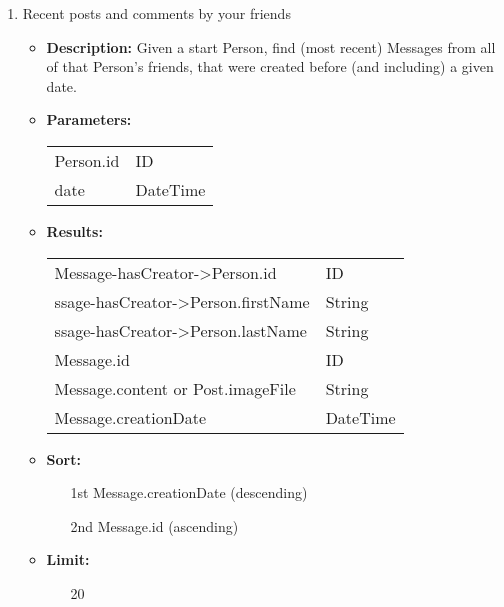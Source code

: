 {\begin{enumerate}
                \item Recent posts and comments by your friends
                    \begin{itemize}
                        \item \textbf{Description:}
                          Given a start Person, find (most recent) Messages from
                            all of that Person's friends, that were created before (and
                            including) a given date.
                        \item \textbf{Parameters:} \\
                            \begin{tabular}{ll}
                                Person.id 										& ID \\
                                date 											& DateTime \\
                            \end{tabular}
                        \item \textbf{Results:} \\
                            \begin{tabular}{ll}
                              Message-hasCreator->Person.id 										& ID \\
                                ssage-hasCreator->Person.firstName								& String \\
                                ssage-hasCreator->Person.lastName									& String \\
                                Message.id 								& ID \\
                                Message.content or Post.imageFile 	& String \\
                                Message.creationDate	& DateTime \\
                            \end{tabular}
                        \item \textbf{Sort:}
                          \begin{itemize}
                            \item[1st] Message.creationDate (descending)
                            \item[2nd] Message.id (ascending)
                          \end{itemize}
                \item \textbf{Limit:}
                  \begin{itemize}
                    \item[] 20
                  \end{itemize}
                    \end{itemize}


\end{enumerate}}
